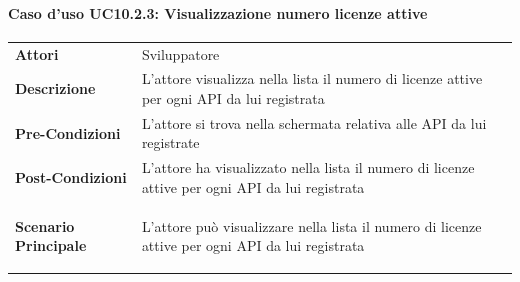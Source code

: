 \paragraph{Caso d'uso UC10.2.3: Visualizzazione numero licenze attive}
\label{UC10_2_3}

\begin{minipage}{\linewidth}
	\begin{tabular}{ l | p{11cm}}
		\hline
		\rowcolor{Gray}
		\multicolumn{2}{c}{UC10.2.3 - Visualizzazione numero licenze attive} \\
		\hline
		\textbf{Attori} & Sviluppatore \\
		\textbf{Descrizione} & L'attore visualizza nella lista il numero di licenze attive per ogni API da lui registrata \\
		\textbf{Pre-Condizioni} & L'attore si trova nella schermata relativa alle API da lui registrate \\
		\textbf{Post-Condizioni} & L'attore ha visualizzato nella lista il numero di licenze attive per ogni API da lui registrata \\
		\textbf{Scenario Principale} & 
		\begin{enumerate*}[label=(\arabic*.),itemjoin={\newline}]
			\item L'attore può visualizzare nella lista il numero di licenze attive per ogni API da lui registrata
		\end{enumerate*}\\
	\end{tabular}
\end{minipage}

\newpage
